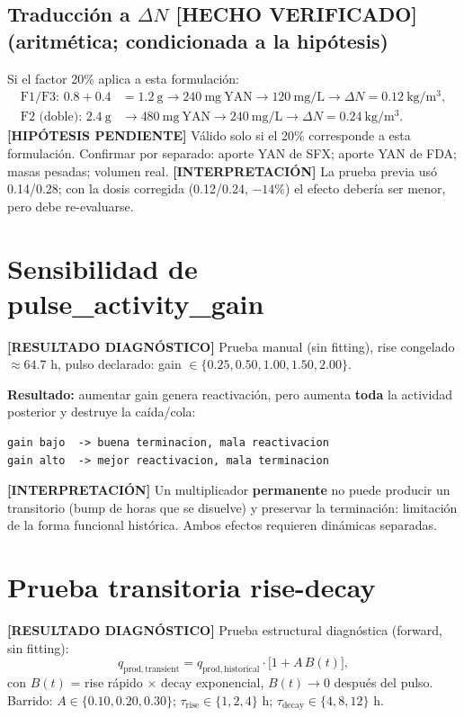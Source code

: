 \documentclass[11pt,a4paper]{article}
\newcommand{\hecho}{\textcolor{hecho}{\textbf{[HECHO VERIFICADO]}}}
\newcommand{\diag}{\textcolor{diagc}{\textbf{[RESULTADO DIAGN\'OSTICO]}}}
\newcommand{\interp}{\textcolor{interp}{\textbf{[INTERPRETACI\'ON]}}}
\newcommand{\hipo}{\textcolor{hipo}{\textbf{[HIP\'OTESIS PENDIENTE]}}}
\begin{document}
\subsection{Traducci\'on a $\Delta N$ \hecho{} (aritm\'etica; condicionada a la hip\'otesis)}
Si el factor 20\% aplica a esta formulaci\'on:
\begin{align}
\text{F1/F3: } 0.8+0.4 &= 1.2\ \mathrm{g} \to 240\ \mathrm{mg\ YAN} \to 120\ \mathrm{mg/L} \to \Delta N = 0.12\ \mathrm{kg/m^3},\\
\text{F2 (doble): } 2.4\ \mathrm{g} &\to 480\ \mathrm{mg\ YAN} \to 240\ \mathrm{mg/L} \to \Delta N = 0.24\ \mathrm{kg/m^3}.
\end{align}
\hipo{} V\'alido solo si el 20\% corresponde a esta formulaci\'on. Confirmar por separado: aporte YAN de SFX; aporte YAN de FDA; masas pesadas; volumen real. \interp{} La prueba previa us\'o 0.14/0.28; con la dosis corregida (0.12/0.24, $-14\%$) el efecto deber\'ia ser menor, pero debe re-evaluarse.

\section{Sensibilidad de pulse\_activity\_gain}

\diag{} Prueba manual (sin fitting), rise congelado $\approx 64.7$ h, pulso declarado: gain $\in \{0.25, 0.50, 1.00, 1.50, 2.00\}$.

\textbf{Resultado:} aumentar gain genera reactivaci\'on, pero aumenta \textbf{toda} la actividad posterior y destruye la ca\'ida/cola:
\begin{verbatim}
gain bajo  -> buena terminacion, mala reactivacion
gain alto  -> mejor reactivacion, mala terminacion
\end{verbatim}

\interp{} Un multiplicador \textbf{permanente} no puede producir un transitorio (bump de horas que se disuelve) y preservar la terminaci\'on: limitaci\'on de la forma funcional hist\'orica. Ambos efectos requieren din\'amicas separadas.

\section{Prueba transitoria rise-decay}

\diag{} Prueba estructural diagn\'ostica (forward, sin fitting):
\begin{equation}
q_{\mathrm{prod,transient}} = q_{\mathrm{prod,historical}}\cdot\big[1 + A\,B(t)\big],
\end{equation}
con $B(t)$ = rise r\'apido $\times$ decay exponencial, $B(t)\to 0$ despu\'es del pulso. Barrido: $A \in \{0.10, 0.20, 0.30\}$; $\tau_{\mathrm{rise}} \in \{1,2,4\}$ h; $\tau_{\mathrm{decay}} \in \{4,8,12\}$ h.
\end{document}
